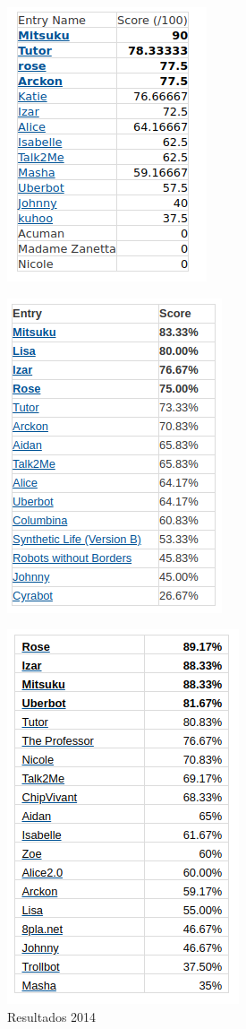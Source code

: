 \documentclass{article}
\begin{document}
\begin{figure}[H]
\centering
\begin{minipage}{.5\textwidth}
  \centering
  \includegraphics[width=.4\linewidth]{TT2016}
  \label{fig:tt2016}
\end{minipage}%
\begin{minipage}{.5\textwidth}
  \centering
  \includegraphics[width=.4\linewidth]{TT2015}
  \label{fig:tt2015}
\end{minipage}
\end{figure}

\begin{figure}[H]
  \centering
  \includegraphics[width=.4\linewidth]{TT2014}
  \caption{Resultados 2014}
  \label{fig:tt2014}
\end{figure}\\
\newpage
\end{document}
